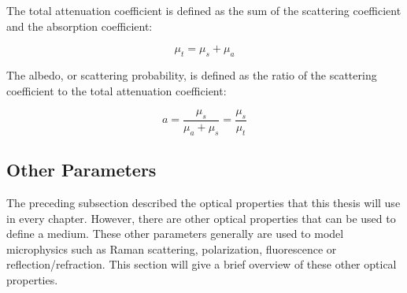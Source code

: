 The total attenuation coefficient is defined as the sum of the scattering coefficient and the absorption coefficient:

\begin{equation}
\mu_t=\mu_s+\mu_a
\end{equation}

The albedo, or scattering probability, is defined as the ratio of the scattering coefficient to the total attenuation coefficient:

\begin{equation}
a = \frac{\mu_s}{\mu_a+\mu_s}=\frac{\mu_s}{\mu_t}
\end{equation}


\subsection*{Other Parameters}\label{sec:other}
The preceding subsection described the optical properties that this thesis will use in every chapter. However, there are other optical properties that can be used to define a medium. These other parameters generally are used to model microphysics such as Raman scattering, polarization, fluorescence or reflection/refraction. This section will give a brief overview of these other optical properties.







